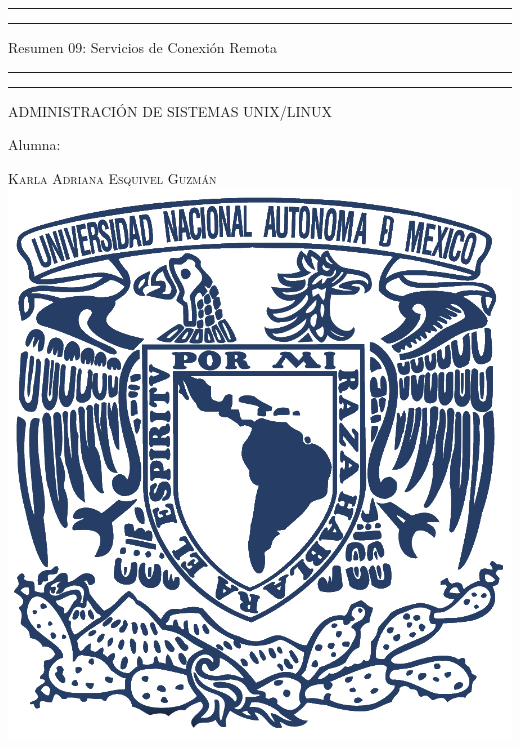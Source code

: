 \documentclass[a4paper, 11pt, oneside]{article}
\begin{document}
 

\begin{titlepage} 

	\centering 
	
	\scshape 
	
	\vspace*{\baselineskip} 
	
	
	
	\rule{\textwidth}{1.6pt}\vspace*{-\baselineskip}\vspace*{2pt} 
	\rule{\textwidth}{0.4pt} 
	
	\vspace{0.75\baselineskip} 
	
	{\LARGE Resumen 09: Servicios de Conexión Remota}	
	\vspace{0.75\baselineskip} 
	
	\rule{\textwidth}{0.4pt}\vspace*{-\baselineskip}\vspace{3.2pt}
	\rule{\textwidth}{1.6pt} 
	
	\vspace{2\baselineskip} 
	

	ADMINISTRACIÓN DE SISTEMAS UNIX/LINUX
	
	\vspace*{3\baselineskip} 
	
	
	
	Alumna:
	
	\vspace{0.5\baselineskip} 
	
	{\scshape\Large Karla Adriana Esquivel Guzmán \\} 
	\vspace{0.5\baselineskip} 
	\vfill
	\includegraphics{unam.jpg}
	

\end{titlepage}
\end{document}
